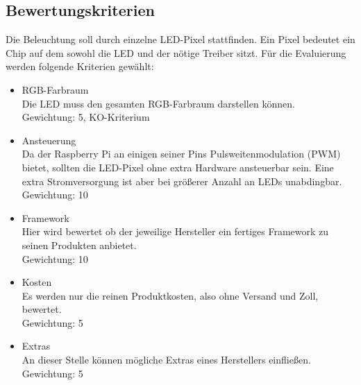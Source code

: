 
\subsection{Bewertungskriterien}
Die Beleuchtung soll durch einzelne LED-Pixel stattfinden. Ein Pixel bedeutet ein Chip auf dem sowohl die LED und der nötige Treiber sitzt. Für die Evaluierung werden folgende Kriterien gewählt:
\begin{itemize}
\item RGB-Farbraum \\
Die LED muss den gesamten RGB-Farbraum darstellen können. \\
Gewichtung: 5, KO-Kriterium
\item Ansteuerung \\
Da der Raspberry Pi an einigen seiner Pins Pulsweitenmodulation (PWM) bietet, sollten die LED-Pixel ohne extra Hardware ansteuerbar sein. Eine extra Stromversorgung ist aber bei größerer Anzahl an LEDs unabdingbar. \\
Gewichtung: 10
\item Framework \\
Hier wird bewertet ob der jeweilige Hersteller ein fertiges Framework zu seinen Produkten anbietet. \\
Gewichtung: 10
\item Kosten \\
Es werden nur die reinen Produktkosten, also ohne Versand und Zoll, bewertet. \\
Gewichtung: 5
\item Extras \\
An dieser Stelle können mögliche Extras eines Herstellers einfließen. \\
Gewichtung: 5
\end{itemize}

